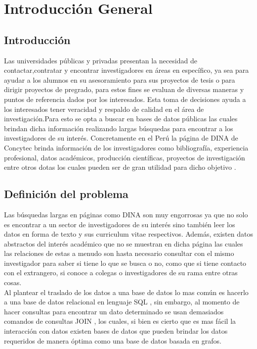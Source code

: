 \chapter{Introducción General}

\section{Introducción}
Las universidades públicas y privadas presentan la necesidad de contactar,contratar y encontrar investigadores en áreas en específico, ya sea para ayudar a los alumnos en su asesoramiento para sus proyectos de tesis o para dirigir proyectos de pregrado, para estos fines se evaluan de diversas maneras y puntos de referencia dados por los interesados. Esta toma de decisiones ayuda a los interesados tener veracidad y respaldo de calidad en el área de investigación.Para esto se opta a buscar en bases de datos públicas las cuales brindan dicha información realizando largas búsquedas para encontrar a los investigadores de su interés. Concretamente en el Perú la página de DINA de Concytec brinda información de los investigadores como bibliografía, experiencia profesional, datos académicos, producción científicas, proyectos de investigación entre otros dotas los cuales pueden ser de gran utilidad para dicho objetivo .

\section{Definición del problema}
Las búsquedas largas en páginas como DINA son muy engorrosas ya que no solo es encontrar a un sector de investigadores de su interés sino también leer los datos en forma de texto y sus curriculum vitae respectivos.
Además, existen datos abstractos del interés académico que no se muestran en dicha página las cuales las relaciones de estas a menudo son hasta necesario consultar con el mismo investigador para saber si tiene lo que se busca o no, como que si tiene contacto con el extrangero, si conoce a colegas o investigadores de su rama entre otras cosas.\\
Al plantear el traslado de los datos a una base de datos lo mas común es hacerlo a una base de datos relacional en lenguaje SQL , sin embargo, al momento de hacer consultas para encontrar un dato determinado se usan demasiados comandos de consultas JOIN , los cuales, si bien es cierto que es mas fácil la interacción con datos existen bases de datos que pueden brindar los datos requeridos de manera óptima como una base de datos basada en grafos.

